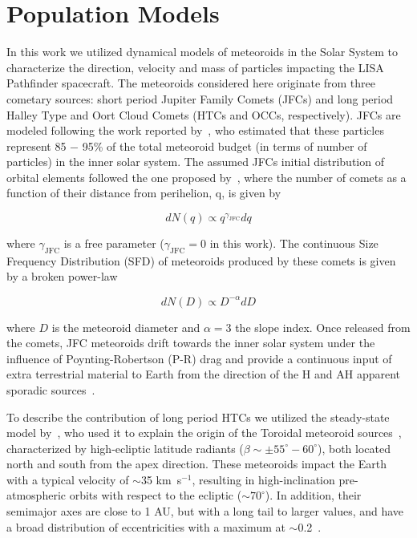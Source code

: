 \documentclass[preprint, trackchanges]{aastex61}
\begin{document}
\FloatBarrier
\section{Population Models}\label{sec:models}

In this work we utilized dynamical models of meteoroids in the Solar System to characterize the direction, velocity and mass of particles impacting the LISA Pathfinder spacecraft.
The meteoroids considered here originate from three cometary sources: short period Jupiter Family Comets (JFCs) and long period Halley Type and Oort Cloud Comets (HTCs and OCCs, respectively). JFCs are modeled following the work  reported by~\cite{Nesvorny10,Nesvorny11a}, who estimated that these particles represent 85 $-$ 95\% of the total meteoroid budget (in terms of number of particles) in the inner solar system. The assumed JFCs initial distribution of orbital elements followed the one proposed by~\cite{LevisonDuncan97}, where the number of comets as a function of their distance from perihelion, q, is given by

\begin{equation}
dN(q)\propto q^{\gamma_\mathrm{JFC}} dq\label{nq}
\end{equation}

\noindent where $\gamma_\mathrm{JFC}$ is a free parameter ($\gamma_\mathrm{JFC} = 0$ in this work). The continuous Size Frequency Distribution (SFD) of meteoroids produced by these comets is given by a broken power-law

\begin{equation}
dN(D)\propto D^{-\alpha}dD\label{nd}
\end{equation}

\noindent where $D$ is the meteoroid diameter and $\alpha=3$ the slope index. Once released from the comets, JFC meteoroids drift towards the inner solar system under the influence of Poynting-Robertson (P-R) drag and provide a continuous input of extra terrestrial material to Earth from the direction of the H and AH apparent sporadic sources~\cite[][]{JonesBrown93,Nesvorny10}.

To describe the contribution of long period HTCs we utilized the steady-state model by~\cite{Pokorny14}, who used it to explain the origin of the Toroidal meteoroid sources~\cite[][]{JonesBrown93,CampbellBrown09,Janches15}, characterized by high-ecliptic latitude radiants ($\beta\sim\pm 55^{\circ} - 60^{\circ}$), both located north and south from the apex direction. These meteoroids impact the Earth with a typical velocity of $\sim$35 km~s$^{-1}$, resulting in high-inclination pre-atmospheric orbits with respect to the ecliptic ($\sim70^{\circ}$). In addition, their semimajor axes are close to 1 AU, but with a long tail to larger values, and have a broad distribution of eccentricities with a maximum at $\sim$0.2~\cite[See Figure 13 in][]{Janches15}. 
\end{document}
